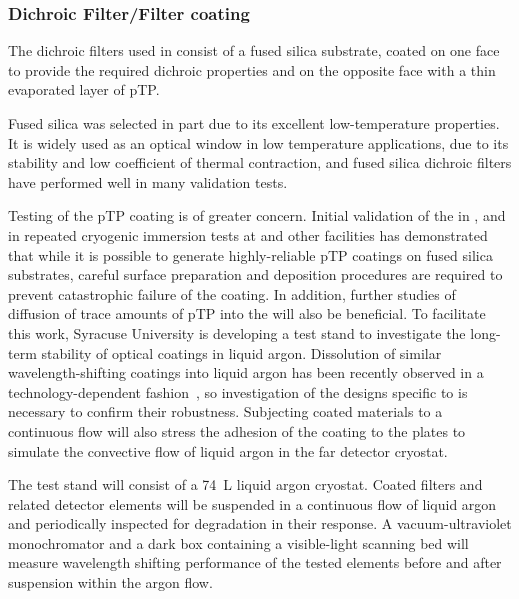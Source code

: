 \subsubsection{Dichroic Filter/Filter coating}

The dichroic filters used in  consist of a fused silica substrate, coated on one face to provide the required dichroic properties and on the opposite face with a thin evaporated layer of pTP.

Fused silica was selected in part due to its excellent low-temperature properties.  It is widely used as an optical window in low temperature applications, due to its stability and low coefficient of thermal contraction, and fused silica dichroic filters have performed well in many  validation tests.

Testing of the pTP coating is of greater concern.  Initial validation of the  in ,  and in repeated cryogenic immersion tests at  and other facilities has demonstrated that while it is possible to generate highly-reliable pTP coatings on fused silica substrates, careful surface preparation and deposition procedures are required to prevent catastrophic failure of the coating.  In addition, further studies of diffusion of trace amounts of pTP into the  will also be beneficial.  To facilitate this work,  
Syracuse University is 
 developing a test stand to investigate the long-term stability of  optical coatings in liquid argon. Dissolution of similar wavelength-shifting coatings into liquid argon has been recently observed in a technology-dependent fashion~\cite{TPBdiss}, so investigation of the designs specific to  is necessary to confirm their robustness. Subjecting coated materials to a continuous flow will also stress the adhesion of the coating to the plates to simulate the convective flow of liquid argon in the far detector cryostat.

The test stand will consist of a \SI{74}{L} liquid argon cryostat. Coated filters and related detector elements will be suspended in a continuous flow of liquid argon and periodically inspected for degradation in their response. A vacuum-ultraviolet monochromator and a dark box containing a visible-light scanning bed will measure wavelength shifting performance of the tested elements before and after suspension within the argon flow.


